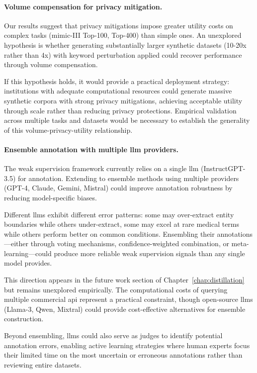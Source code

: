 \paragraph{Volume compensation for privacy mitigation.}

Our results suggest that privacy mitigations impose greater utility costs on complex tasks (\gls{mimic}-III Top-100, Top-400) than simple ones.
An unexplored hypothesis is whether generating substantially larger synthetic datasets (10-20x rather than 4x) with keyword perturbation applied could recover performance through volume compensation.

If this hypothesis holds, it would provide a practical deployment strategy: institutions with adequate computational resources could generate massive synthetic corpora with strong privacy mitigations, achieving acceptable utility through scale rather than reducing privacy protections.
Empirical validation across multiple tasks and datasets would be necessary to establish the generality of this volume-privacy-utility relationship.

\paragraph{Ensemble annotation with multiple \gls{llm} providers.}

The weak supervision framework currently relies on a single \gls{llm} (InstructGPT-3.5) for annotation.
Extending to ensemble methods using multiple providers (GPT-4, Claude, Gemini, Mistral) could improve annotation robustness by reducing model-specific biases.

Different \glspl{llm} exhibit different error patterns: some may over-extract entity boundaries while others under-extract, some may excel at rare medical terms while others perform better on common conditions.
Ensembling their annotations—either through voting mechanisms, confidence-weighted combination, or meta-learning—could produce more reliable weak supervision signals than any single model provides.

This direction appears in the future work section of Chapter~\ref{chap:distillation} but remains unexplored empirically.
The computational costs of querying multiple commercial \gls{api} represent a practical constraint, though open-source \glspl{llm} (Llama-3, Qwen, Mixtral) could provide cost-effective alternatives for ensemble construction.

Beyond ensembling, \glspl{llm} could also serve as judges to identify potential annotation errors, enabling active learning strategies where human experts focus their limited time on the most uncertain or erroneous annotations rather than reviewing entire datasets.

